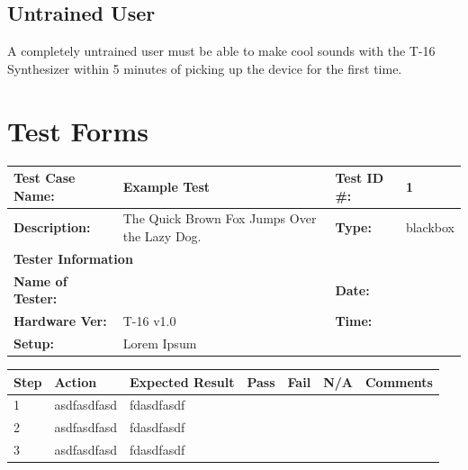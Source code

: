 \documentclass{article}
\begin{document}
\subsection{Untrained User}
A completely untrained user must be able to make cool sounds with the
T-16 Synthesizer within 5 minutes of picking up the device for the
first time. 
\newpage
\section {Test Forms}

\begin{tabular}{|p{1.3in}|p{3in}|p{.8in}|p{.5in}|}
  \hline
  \textbf{Test Case Name:} & Example Test & \textbf{Test ID \#:} & 1\\
  \hline
  \textbf{Description:} & The Quick Brown Fox Jumps Over the Lazy Dog. & \textbf{Type:} & blackbox \\
  \hline
  \multicolumn{4}{|l|}{\textbf{Tester Information}} \\ 
  \hline
  \textbf{Name of Tester:} & & \textbf{Date:} & \\
  \hline
  \textbf{Hardware Ver:} & T-16 v1.0 & \textbf{Time:} & \\
  \hline
  \textbf{Setup:} & \multicolumn{3}{l|}{Lorem Ipsum} \\
  \hline
\end{tabular}
\begin{tabular}{|p{.3in}|p{1in}|p{1.3in}|p{.25in}|p{.25in}|p{.3in}|p{1.7in}|}
  \hline
  \textbf{Step} & \textbf{Action} & \textbf{Expected Result} & \textbf{Pass} & \textbf{Fail} & \textbf{N/A} & \textbf{Comments} \\
  \hline
  1 & asdfasdfasd & fdasdfasdf & & & &\\
  \hline
  2 & asdfasdfasd & fdasdfasdf & & & &\\
  \hline
  3 & asdfasdfasd & fdasdfasdf & & & &\\
  \hline
\end{tabular}
\end{document}
